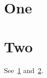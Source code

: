 \documentclass{article}
\begin{document}
\section{One}\label{sec:one}
\section{Two}\label{sec:two}
See~\ref{sec:one} and~\ref{sec:two}.
\end{document}
